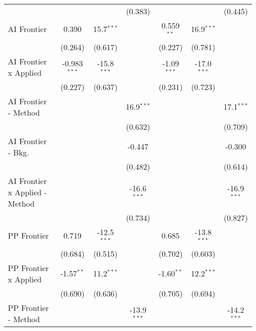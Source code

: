 \begin{tabular}{lcccccc}
                                  &                &               & (0.383)       &               &               & (0.445)\\   
   AI Frontier                    & 0.390          & 15.7$^{***}$  &               & 0.559$^{**}$  & 16.9$^{***}$  &   \\   
                                  & (0.264)        & (0.617)       &               & (0.227)       & (0.781)       &   \\   
   AI Frontier x Applied          & -0.983$^{***}$ & -15.8$^{***}$ &               & -1.09$^{***}$ & -17.0$^{***}$ &   \\   
                                  & (0.227)        & (0.637)       &               & (0.231)       & (0.723)       &   \\   
   AI Frontier - Method           &                &               & 16.9$^{***}$  &               &               & 17.1$^{***}$\\   
                                  &                &               & (0.632)       &               &               & (0.709)\\   
   AI Frontier - Bkg.             &                &               & -0.447        &               &               & -0.300\\   
                                  &                &               & (0.482)       &               &               & (0.614)\\   
   AI Frontier x Applied - Method &                &               & -16.6$^{***}$ &               &               & -16.9$^{***}$\\   
                                  &                &               & (0.734)       &               &               & (0.827)\\   
   PP Frontier                    & 0.719          & -12.5$^{***}$ &               & 0.685         & -13.8$^{***}$ &   \\   
                                  & (0.684)        & (0.515)       &               & (0.702)       & (0.603)       &   \\   
   PP Frontier x Applied          & -1.57$^{**}$   & 11.2$^{***}$  &               & -1.60$^{**}$  & 12.2$^{***}$  &   \\   
                                  & (0.690)        & (0.636)       &               & (0.705)       & (0.694)       &   \\   
   PP Frontier - Method           &                &               & -13.9$^{***}$ &               &               & -14.2$^{***}$\\   

\end{tabular}
